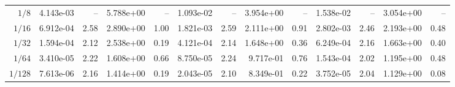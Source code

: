\begin{landscape}
\begin{center}
\begin{tabular}{
r rr rr rr rr rr rr
}
\midrule
$1/8$ & 4.143e-03 & -- & 5.788e+00 & -- & 1.093e-02 & -- & 3.954e+00 & -- & 1.538e-02 & -- & 3.054e+00 & -- \\
$1/16$ & 6.912e-04 & 2.58 & 2.890e+00 & 1.00 & 1.821e-03 & 2.59 & 2.111e+00 & 0.91 & 2.802e-03 & 2.46 & 2.193e+00 & 0.48 \\
$1/32$ & 1.594e-04 & 2.12 & 2.538e+00 & 0.19 & 4.121e-04 & 2.14 & 1.648e+00 & 0.36 & 6.249e-04 & 2.16 & 1.663e+00 & 0.40 \\
$1/64$ & 3.410e-05 & 2.22 & 1.608e+00 & 0.66 & 8.750e-05 & 2.24 & 9.717e-01 & 0.76 & 1.543e-04 & 2.02 & 1.195e+00 & 0.48 \\
$1/128$ & 7.613e-06 & 2.16 & 1.414e+00 & 0.19 & 2.043e-05 & 2.10 & 8.349e-01 & 0.22 & 3.752e-05 & 2.04 & 1.129e+00 & 0.08 \\
\bottomrule
\end{tabular}
\end{center}
\vfill
\begin{center}\thepage\end{center}
\clearpage
\end{landscape}

